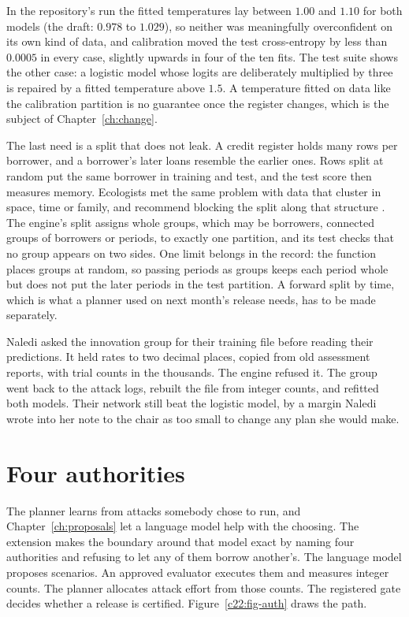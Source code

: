 In the repository's run the fitted temperatures lay between $1.00$ and $1.10$ for both models (the
draft: $0.978$ to $1.029$), so neither was meaningfully overconfident on its own kind of data, and
calibration moved the test cross-entropy by less than $0.0005$ in every case, slightly upwards in
four of the ten fits. The test suite shows the other case: a logistic model whose logits are
deliberately multiplied by three is repaired by a fitted temperature above $1.5$. A temperature
fitted on data like the calibration partition is no guarantee once the register changes, which is
the subject of Chapter~\ref{ch:change}.

The last need is a split that does not leak. A credit register holds many rows per borrower, and a
borrower's later loans resemble the earlier ones. Rows split at random put the same borrower in
training and test, and the test score then measures memory. Ecologists met the same problem with
data that cluster in space, time or family, and recommend blocking the split along that structure
\citep{roberts2017}. The engine's split assigns whole groups, which may be borrowers, connected
groups of borrowers or periods, to exactly one partition, and its test checks that no group
appears on two sides. One limit belongs in the record: the function places groups at random, so
passing periods as groups keeps each period whole but does not put the later periods in the test
partition. A forward split by time, which is what a planner used on next month's release needs,
has to be made separately.

Naledi asked the innovation group for their training file before reading their predictions. It
held rates to two decimal places, copied from old assessment reports, with trial counts in the
thousands. The engine refused it. The group went back to the attack logs, rebuilt the file from
integer counts, and refitted both models. Their network still beat the logistic model, by a margin
Naledi wrote into her note to the chair as too small to change any plan she would make.

\section{Four authorities}\label{c22:sec-authorities}

The planner learns from attacks somebody chose to run, and Chapter~\ref{ch:proposals} let a language model help
with the choosing. The extension makes the boundary around that model exact by naming four
authorities and refusing to let any of them borrow another's. The language model proposes
scenarios. An approved evaluator executes them and measures integer counts. The planner allocates
attack effort from those counts. The registered gate decides whether a release is certified.
Figure~\ref{c22:fig-auth} draws the path.

